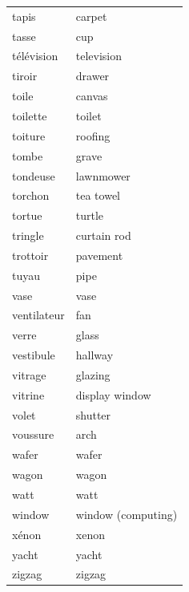 \documentclass[12pt,a4paper]{article}
\begin{document}
\begin{longtable}{p{4cm} p{6cm}}
tapis & carpet \\
tasse & cup \\
télévision & television \\
tiroir & drawer \\
toile & canvas \\
toilette & toilet \\
toiture & roofing \\
tombe & grave \\
tondeuse & lawnmower \\
torchon & tea towel \\
tortue & turtle \\
tringle & curtain rod \\
trottoir & pavement \\
tuyau & pipe \\
vase & vase \\
ventilateur & fan \\
verre & glass \\
vestibule & hallway \\
vitrage & glazing \\
vitrine & display window \\
volet & shutter \\
voussure & arch \\
wafer & wafer \\
wagon & wagon \\
watt & watt \\
window & window (computing) \\
xénon & xenon \\
yacht & yacht \\
zigzag & zigzag \\
\bottomrule
\end{longtable}

\newpage
\end{document}
